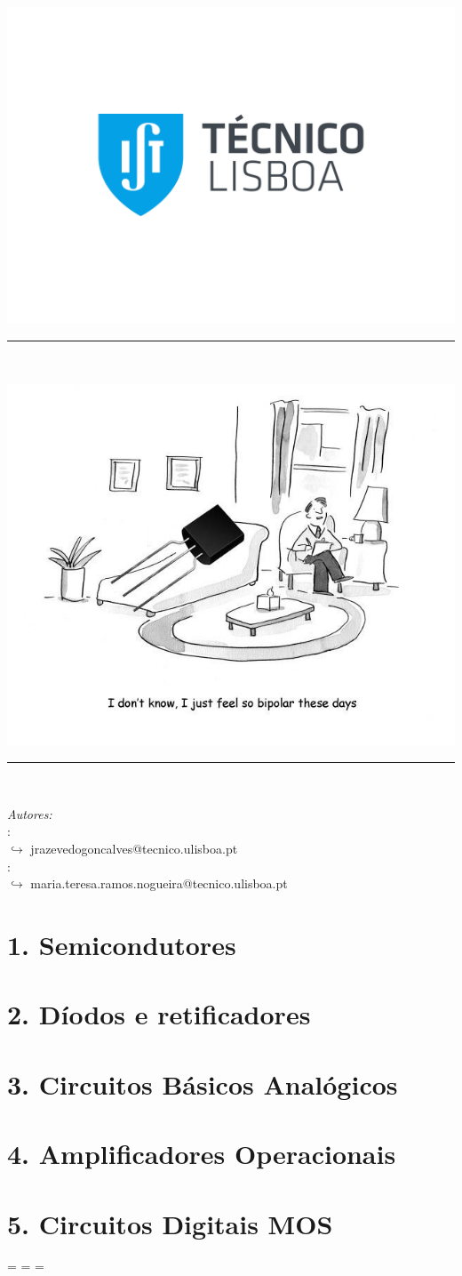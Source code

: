 \documentclass[a4paper,12pt]{article}
\makeatletter
\let\zzzfootnotesize\footnotesize
\def\newfootnotesize{%
\zzzfootnotesize
\abovedisplayskip=0pt
\belowdisplayskip=\abovedisplayskip
\abovedisplayshortskip=\abovedisplayskip
\belowdisplayshortskip=\abovedisplayskip
}
\renewcommand\footnotesize{\protect\newfootnotesize}
\def\maketitle{
  \begin{center}\leavevmode
        \normalfont
        \includegraphics[width=0.5\columnwidth]{img/title-page/IST.pdf}
        \vskip 0.05cm   
        \textsc{\large \department}\\
        \vskip 0.5cm
        \rule{0.95\linewidth}{0.2 mm} %
        {\large \exam}\\[0.5 cm]
        {\huge \bfseries \@title \par} 
        \vspace{1em}
        \includegraphics[scale=0.4]{img/title-page/000.png}
        \rule{0.95\linewidth}{0.2 mm} \\[0.75 cm]
        \begin{minipage}[t]{1\textwidth}
	   \begin{flushleft} \large
                \emph{Autores:}\\
			\normalsize \textbf{\@author} : \studentID\\
                \fontsize{9pt}{11pt}\selectfont $\hookrightarrow$ jrazevedogoncalves@tecnico.ulisboa.pt \\
                \normalsize \textbf{\authorr} : \studentIDD\\
                \scriptsize $\hookrightarrow$ maria.teresa.ramos.nogueira@tecnico.ulisboa.pt
		\end{flushleft}
	\end{minipage}

    \vfill
	{\Large \@date\par}
   \end{center}
   \cleardoublepage
  }
\makeatother
\begin{document}
    \sloppy
    \maketitle
    \tableofcontents
    \setcounter{tocdepth}{4}
    \newpage
    \pagestyle{fancy}


    \clearpage
    \section{1. Semicondutores}\label{sec:semiconductors}%
        
    
    \clearpage
    \section{2. Díodos e retificadores}\label{sec:diodes-and-rectifiers}%
        
        
        
        

    \clearpage
    \section{3. Circuitos Básicos Analógicos}\label{sec:transistors-BJT-MOS}%
        
        

    \clearpage
    \section{4. Amplificadores Operacionais}\label{sec:AmpOps}%

    \clearpage
    \section{5. Circuitos Digitais MOS}\label{sec:circuitos-digitais}%
        


    \clearpage
    
    \nocite{*}
    {\footnotesize%
    }
\end{document}
